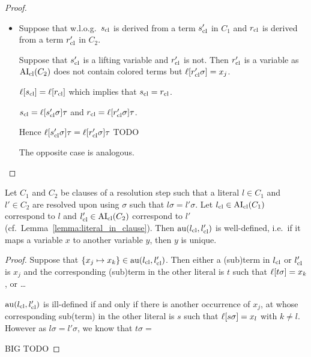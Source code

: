 \documentclass[,%
	paper=a4,%
	twoside=false,%
	liststotoc,
	bibtotoc,
	draft=false,%
	numbers=noendperiod
]{scrartcl}
\begin{document}
\begin{proof}
\begin{itemize}
		\item Suppose that w.l.o.g.\ $s_\mathrm{cl}$ is derived from a term $s_\mathrm{cl}'$ in $C_1$ and $r_\mathrm{cl}$ is derived from a term $r_\mathrm{cl}'$ in $C_2$.

			Suppose that $s_\mathrm{cl}'$ is a lifting variable and $r_\mathrm{cl}'$ is not. 
			Then $r_\mathrm{cl}'$ is a variable as $\operatorname{AI}_\mathrm{cl}(C_2)$ does not contain colored terms but $\ell[r_\mathrm{cl}'\sigma] = x_j$.


			$\ell[s_\mathrm{cl}] = \ell[r_\mathrm{cl}]$ which implies that $s_\mathrm{cl} = r_\mathrm{cl}$.
			
			$s_\mathrm{cl} = \ell[s_\mathrm{cl}'\sigma]\tau$ and
			$r_\mathrm{cl} = \ell[r_\mathrm{cl}'\sigma]\tau$.

			Hence $\ell[s_\mathrm{cl}'\sigma]\tau = \ell[r_\mathrm{cl}'\sigma]\tau$
			TODO
			
			The opposite case is analogous.





			

	\end{itemize}





\end{proof}

\begin{conj}
	Let $C_1$ and $C_2$ be clauses of a resolution step such that a literal $l\in C_1$ and $l' \in C_2$ are resolved upon using $\sigma$ such that $l\sigma = l'\sigma$.
	Let $l_\mathrm{cl} \in \operatorname{AI}_\mathrm{cl}(C_1)$ correspond to $l$ and $l_\mathrm{cl}' \in \operatorname{AI}_\mathrm{cl}(C_2)$ correspond to $l'$ (cf.\ Lemma~\ref{lemma:literal_in_clause}).
	Then
	$\operatorname{au}(l_\mathrm{cl}, l_\mathrm{cl}')$ is well-defined, i.e.~if it maps a variable $x$ to another variable $y$, then $y$ is unique.
\end{conj}
\begin{proof}
	Suppose that $\{x_j \mapsto x_k\} \in \operatorname{au}(l_\mathrm{cl}, l_\mathrm{cl}')$.
	Then either a (sub)term in $l_\mathrm{cl}$ or $l_\mathrm{cl}'$ is $x_j$ and the corresponding (sub)term in the other literal is $t$ such that $\ell[t\sigma] = x_k$, or \dots

	$\operatorname{au}(l_\mathrm{cl}, l_\mathrm{cl}')$ is ill-defined if and only if there is another occurrence of $x_j$, at whose corresponding sub(term) in the other literal is $s$ such that $\ell[s\sigma] = x_l$ with $k\neq l$.
	However as $l\sigma = l'\sigma$, we know that $t\sigma = $

	BIG TODO

\end{proof}
\end{document}
